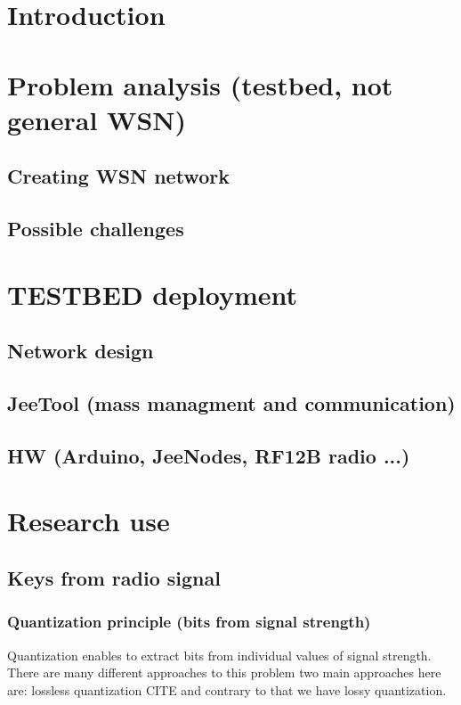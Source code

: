 \documentclass[
  digital, %
  table,   %
  nolof,     %
  nolot,     %
]{fithesis3}
\begin{document}

\chapter{Introduction}
\chapter{ Problem analysis (testbed, not general WSN)}
  \section{Creating WSN network}
  \section{Possible challenges}
\chapter{TESTBED deployment}
  \section{Network design}
  \section{JeeTool (mass managment and communication)}
  \section{HW (Arduino, JeeNodes, RF12B radio ...)}\label{sec:hw}
\chapter{Research use}
  \section{Keys from radio signal}
    \subsection{Quantization principle (bits from signal strength)}
    Quantization enables to extract bits from individual values of signal strength. There are many different approaches to this problem %
    two main approaches here are: lossless quantization CITE and contrary to that we have lossy quantization.
\end{document}
